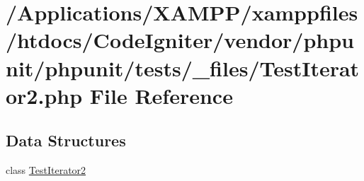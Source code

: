 \hypertarget{_test_iterator2_8php}{}\section{/\+Applications/\+X\+A\+M\+P\+P/xamppfiles/htdocs/\+Code\+Igniter/vendor/phpunit/phpunit/tests/\+\_\+files/\+Test\+Iterator2.php File Reference}
\label{_test_iterator2_8php}
\subsection*{Data Structures}
\begin{DoxyCompactItemize}
\item 
class \mbox{\hyperlink{class_test_iterator2}{Test\+Iterator2}}
\end{DoxyCompactItemize}
